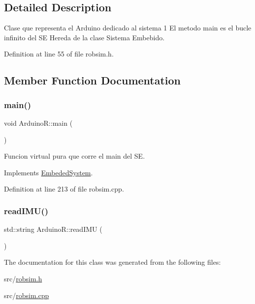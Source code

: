 \subsection{Detailed Description}
Clase que representa el Arduino dedicado al sistema 1 El metodo main es el bucle infinito del SE Hereda de la clase Sistema Embebido. 

Definition at line 55 of file robsim.\+h.



\subsection{Member Function Documentation}
\mbox{\label{classArduinoR_a479b06fd9527e9810b37b91da8fb0f7e}} 
\subsubsection{\texorpdfstring{main()}{main()}}
{\footnotesize\ttfamily void Arduino\+R\+::main (\begin{DoxyParamCaption}{ }\end{DoxyParamCaption})\hspace{0.3cm}{\ttfamily [virtual]}}



Funcion virtual pura que corre el main del SE. 



Implements \hyperlink{classEmbededSystem_a3a333d4954af4068f5e97301b4f55c48}{Embeded\+System}.



Definition at line 213 of file robsim.\+cpp.

\mbox{\label{classArduinoR_a8365ffa8bde5c67337aa9b31fe08f83f}} 
\subsubsection{\texorpdfstring{read\+I\+M\+U()}{readIMU()}}
{\footnotesize\ttfamily std\+::string Arduino\+R\+::read\+I\+MU (\begin{DoxyParamCaption}{ }\end{DoxyParamCaption})}



The documentation for this class was generated from the following files\+:\begin{DoxyCompactItemize}
\item 
src/\hyperlink{robsim_8h}{robsim.\+h}\item 
src/\hyperlink{robsim_8cpp}{robsim.\+cpp}\end{DoxyCompactItemize}
